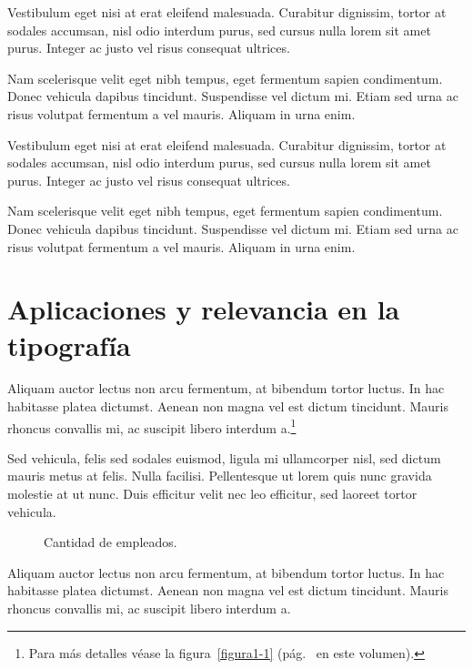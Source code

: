 Vestibulum eget nisi at erat eleifend malesuada. Curabitur dignissim, tortor at sodales accumsan, nisl odio interdum purus, sed cursus nulla lorem sit amet purus. Integer ac justo vel risus consequat ultrices.

Nam scelerisque velit eget nibh tempus, eget fermentum sapien condimentum. Donec vehicula dapibus tincidunt. Suspendisse vel dictum mi. Etiam sed urna ac risus volutpat fermentum a vel mauris. Aliquam in urna enim.

Vestibulum eget nisi at erat eleifend malesuada. Curabitur dignissim, tortor at sodales accumsan, nisl odio interdum purus, sed cursus nulla lorem sit amet purus. Integer ac justo vel risus consequat ultrices.

Nam scelerisque velit eget nibh tempus, eget fermentum sapien condimentum. Donec vehicula dapibus tincidunt. Suspendisse vel dictum mi. Etiam sed urna ac risus volutpat fermentum a vel mauris. Aliquam in urna enim.

\section{Aplicaciones y relevancia en la tipografía}

Aliquam auctor lectus non arcu fermentum, at bibendum tortor luctus. In hac habitasse platea dictumst. Aenean non magna vel est dictum tincidunt. Mauris rhoncus convallis mi, ac suscipit libero interdum a.\footnote{Para más detalles véase la figura~\ref{figura1-1} (pág.~\pageref{figura1-1} en este volumen).}

Sed vehicula, felis sed sodales euismod, ligula mi ullamcorper nisl, sed dictum mauris metus at felis. Nulla facilisi. Pellentesque ut lorem quis nunc gravida molestie at ut nunc. Duis efficitur velit nec leo efficitur, sed laoreet tortor vehicula.

\begin{figure}[!ht]
\centering
\begin{bchart}[step=200,max=1000]
	\ifPDF
		\else
		\ifBNPDF
			\else
			\ifPNGEPUB
			\fi
	\fi
\fi
\end{bchart}
\caption{Cantidad de empleados.}
\end{figure}

Aliquam auctor lectus non arcu fermentum, at bibendum tortor luctus. In hac habitasse platea dictumst. Aenean non magna vel est dictum tincidunt. Mauris rhoncus convallis mi, ac suscipit libero interdum a.

